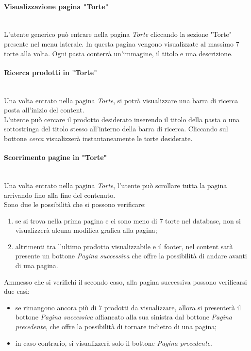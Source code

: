 \paragraph{Visualizzazione pagina "Torte"}\mbox{}\\
\label{par:VisTorte}
L'utente generico può entrare nella pagina \emph{Torte} cliccando la sezione "Torte" presente nel menu laterale.
In questa pagina vengono visualizzate al massimo 7 torte alla volta. Ogni pasta conterrà un'immagine, il titolo e una descrizione.\\

\paragraph{Ricerca prodotti in "Torte"}\mbox{}\\
\label{par:CerTorte}
Una volta entrato nella pagina \emph{Torte}, si potrà visualizzare una barra di ricerca posta all'inizio del content.\\
L'utente può cercare il prodotto desiderato inserendo il titolo della pasta o una sottostringa del titolo stesso all'interno della barra di ricerca. Cliccando sul bottone 
\emph{cerca} visualizzerà instantaneamente le torte desiderate.

\paragraph{Scorrimento pagine in "Torte"}\mbox{}\\
\label{par:PrevNextTorte}
Una volta entrato nella pagina \emph{Torte}, l'utente può scrollare tutta la pagina arrivando fino alla fine del contenuto.\\
Sono due le possibilità che si possono verificare:
\begin{enumerate}
	\item se si trova nella prima pagina e ci sono meno di 7 torte nel database, non si visualizzerà alcuna modifica grafica alla pagina;
	\item altrimenti tra l'ultimo prodotto visualizzabile e il footer, nel content sarà presente un bottone \emph{Pagina successiva} che offre la possibilità di andare avanti 
	di una pagina.
\end{enumerate}	
Ammesso che si verifichi il secondo caso, alla pagina successiva possono verificarsi due casi:
\begin{itemize}
	\item se rimangono ancora più di 7 prodotti da visualizzare, allora si presenterà il bottone \emph{Pagina successiva} affiancato alla sua sinistra dal 
	bottone \emph{Pagina precedente}, che offre la possibilità di tornare indietro di una pagina;
	\item in caso contrario, si visualizzerà solo il bottone \emph{Pagina precedente}.
\end{itemize}	

